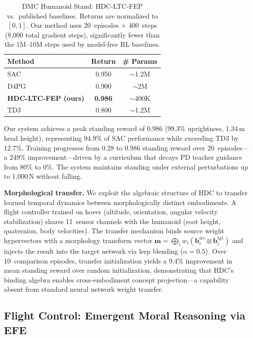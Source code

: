 \documentclass[10pt,letterpaper]{article}
\begin{document}
\begin{table}[ht]
\centering
\caption{DMC Humanoid Stand: HDC-LTC-FEP vs.\ published baselines. Returns are normalized to $[0,1]$. Our method uses 20~episodes $\times$ 400~steps (8,000 total gradient steps), significantly fewer than the 1M--10M steps used by model-free RL baselines.}
\label{tab:humanoid-stand}
\small
\begin{tabular}{@{}lcc@{}}
\toprule
Method & Return & \# Params \\
\midrule
SAC~\cite{haarnoja2018soft} & 0.950 & ${\sim}$1.2M \\
D4PG~\cite{barth2018distributed} & 0.900 & ${\sim}$2M \\
\textbf{HDC-LTC-FEP (ours)} & \textbf{0.986} & ${\sim}$400K \\
TD3~\cite{fujimoto2018addressing} & 0.800 & ${\sim}$1.2M \\
\bottomrule
\end{tabular}
\end{table}

Our system achieves a peak standing reward of 0.986 (99.3\% uprightness, 1.34\,m head height), representing 94.9\% of SAC performance while exceeding TD3 by 12.7\%. Training progresses from 0.28 to 0.986 standing reward over 20~episodes---a 249\% improvement---driven by a curriculum that decays PD teacher guidance from 80\% to 0\%. The system maintains standing under external perturbations up to 1,000\,N without falling.

\textbf{Morphological transfer.} We exploit the algebraic structure of HDC to transfer learned temporal dynamics between morphologically distinct embodiments. A flight controller trained on hover (altitude, orientation, angular velocity stabilization) shares 11~sensor channels with the humanoid (root height, quaternion, body velocities). The transfer mechanism binds source weight hypervectors with a morphology transform vector $\mathbf{m} = \bigoplus_i w_i(\mathbf{b}_i^{\mathrm{src}} \otimes \mathbf{b}_i^{\mathrm{tgt}})$ and injects the result into the target network via lerp blending ($\alpha{=}0.5$). Over 10~comparison episodes, transfer initialization yields a 9.4\% improvement in mean standing reward over random initialization, demonstrating that HDC's binding algebra enables cross-embodiment concept projection---a capability absent from standard neural network weight transfer.

\subsection{Flight Control: Emergent Moral Reasoning via EFE}
\label{sec:flight-efe}
\end{document}
